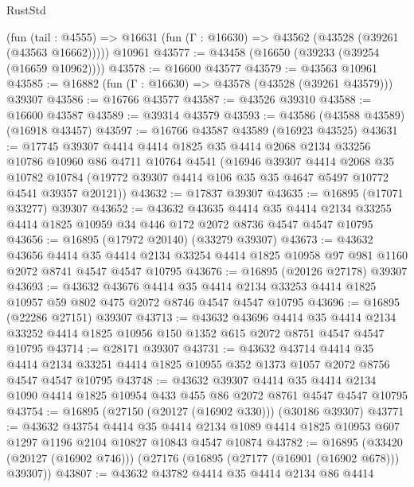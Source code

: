 \begin{lexlean}{RustStd}
\begin{coremodule}
    (fun (tail : @4555) => @16631 (fun (Γ : @16630) => @43562 (@43528 (@39261 (@43563 @16662)))))
    @10961
@43577 := @43458 (@16650 (@39233 (@39254 (@16659 @10962))))
@43578 := @16600 @43577
@43579 := @43563 @10961
@43585 := @16882 (fun (Γ : @16630) => @43578 (@43528 (@39261 @43579))) @39307
@43586 := @16766 @43577
@43587 := @43526 @39310
@43588 := @16600 @43587
@43589 := @39314 @43579
@43593 := @43586 (@43588 @43589) (@16918 @43457)
@43597 := @16766 @43587 @43589 (@16923 @43525)
@43631 := @17745
    @39307
    @4414
    @4414
    @1825
    @35
    @4414
    @2068
    @2134
    @33256
    @10786
    @10960
    @86
    @4711
    @10764
    @4541
    (@16946
      @39307
      @4414
      @2068
      @35
      @10782
      @10784
      (@19772 @39307 @4414 @106 @35 @35 @4647 @5497 @10772 @4541 @39357 @20121))
@43632 := @17837 @39307
@43635 := @16895 (@17071 @33277) @39307
@43652 := @43632
    @43635
    @4414
    @35
    @4414
    @2134
    @33255
    @4414
    @1825
    @10959
    @34
    @446
    @172
    @2072
    @8736
    @4547
    @4547
    @10795
@43656 := @16895 (@17972 @20140) (@33279 @39307)
@43673 := @43632
    @43656
    @4414
    @35
    @4414
    @2134
    @33254
    @4414
    @1825
    @10958
    @97
    @981
    @1160
    @2072
    @8741
    @4547
    @4547
    @10795
@43676 := @16895 (@20126 @27178) @39307
@43693 := @43632
    @43676
    @4414
    @35
    @4414
    @2134
    @33253
    @4414
    @1825
    @10957
    @59
    @802
    @475
    @2072
    @8746
    @4547
    @4547
    @10795
@43696 := @16895 (@22286 @27151) @39307
@43713 := @43632
    @43696
    @4414
    @35
    @4414
    @2134
    @33252
    @4414
    @1825
    @10956
    @150
    @1352
    @615
    @2072
    @8751
    @4547
    @4547
    @10795
@43714 := @28171 @39307
@43731 := @43632
    @43714
    @4414
    @35
    @4414
    @2134
    @33251
    @4414
    @1825
    @10955
    @352
    @1373
    @1057
    @2072
    @8756
    @4547
    @4547
    @10795
@43748 := @43632
    @39307
    @4414
    @35
    @4414
    @2134
    @1090
    @4414
    @1825
    @10954
    @433
    @455
    @86
    @2072
    @8761
    @4547
    @4547
    @10795
@43754 := @16895 (@27150 (@20127 (@16902 @330))) (@30186 @39307)
@43771 := @43632
    @43754
    @4414
    @35
    @4414
    @2134
    @1089
    @4414
    @1825
    @10953
    @607
    @1297
    @1196
    @2104
    @10827
    @10843
    @4547
    @10874
@43782 := @16895
    (@33420 (@20127 (@16902 @746)))
    (@27176 (@16895 (@27177 (@16901 (@16902 @678))) @39307))
@43807 := @43632
    @43782
    @4414
    @35
    @4414
    @2134
    @86
    @4414

\end{coremodule}
\end{lexlean}
